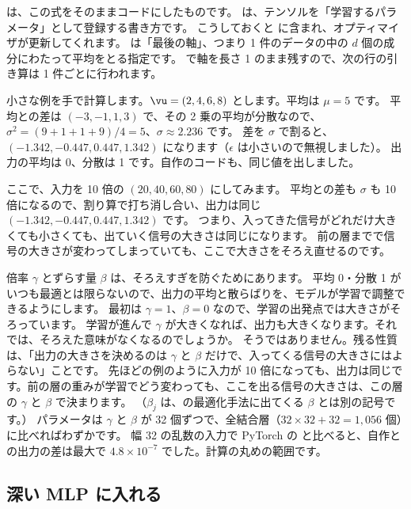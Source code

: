 
は、この式をそのままコードにしたものです。
 は、テンソルを「学習するパラメータ」として登録する書き方です。
こうしておくと  に含まれ、オプティマイザが更新してくれます。
 は「最後の軸」、つまり 1 件のデータの中の $d$ 個の成分にわたって平均をとる指定です。
 で軸を長さ 1 のまま残すので、次の行の引き算は 1 件ごとに行われます。

小さな例を手で計算します。$\vu=(2, 4, 6, 8)$ とします。平均は $\mu=5$ です。
平均との差は $(-3,-1,1,3)$ で、その 2 乗の平均が分散なので、$\sigma^2=(9+1+1+9)/4=5$、$\sigma\approx 2.236$ です。
差を $\sigma$ で割ると、$(-1.342, -0.447, 0.447, 1.342)$ になります（$\epsilon$ は小さいので無視しました）。
出力の平均は 0、分散は 1 です。自作のコードも、同じ値を出しました。

ここで、入力を 10 倍の $(20, 40, 60, 80)$ にしてみます。
平均との差も $\sigma$ も 10 倍になるので、割り算で打ち消し合い、出力は同じ $(-1.342, -0.447, 0.447, 1.342)$ です。
つまり、入ってきた信号がどれだけ大きくても小さくても、出ていく信号の大きさは同じになります。
前の層までで信号の大きさが変わってしまっていても、ここで大きさをそろえ直せるのです。

倍率 $\gamma$ とずらす量 $\beta$ は、そろえすぎを防ぐためにあります。
平均 0・分散 1 がいつも最適とは限らないので、出力の平均と散らばりを、モデルが学習で調整できるようにします。
最初は $\gamma=1$、$\beta=0$ なので、学習の出発点では大きさがそろっています。
学習が進んで $\gamma$ が大きくなれば、出力も大きくなります。それでは、そろえた意味がなくなるのでしょうか。
そうではありません。残る性質は、「出力の大きさを決めるのは $\gamma$ と $\beta$ だけで、入ってくる信号の大きさにはよらない」ことです。
先ほどの例のように入力が 10 倍になっても、出力は同じです。前の層の重みが学習でどう変わっても、ここを出る信号の大きさは、この層の $\gamma$ と $\beta$ で決まります。
（$\beta_j$ は、の最適化手法に出てくる $\beta$ とは別の記号です。）
パラメータは $\gamma$ と $\beta$ が 32 個ずつで、全結合層（$32\times32+32=1{,}056$ 個）に比べればわずかです。
幅 32 の乱数の入力で PyTorch の  と比べると、自作との出力の差は最大で $4.8\times10^{-7}$ でした。計算の丸めの範囲です。

\subsection*{深い MLP に入れる}

